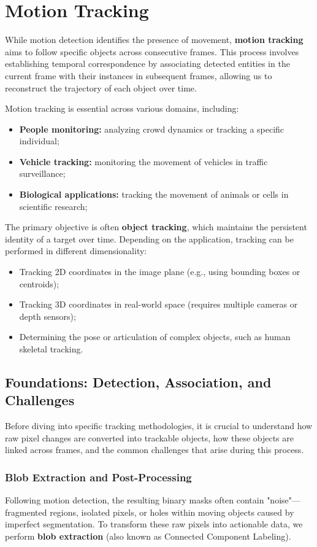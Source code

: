 \section{Motion Tracking}
While motion detection identifies the presence of movement, \textbf{motion tracking} aims to 
follow specific objects across consecutive frames. 
This process involves establishing temporal correspondence by associating detected entities in the current 
frame with their instances in subsequent frames, allowing us to reconstruct the trajectory of each object over time.

Motion tracking is essential across various domains, including:
\begin{itemize}
    \item \textbf{People monitoring:} analyzing crowd dynamics or tracking a specific individual;
    \item \textbf{Vehicle tracking:} monitoring the movement of vehicles in traffic surveillance;
    \item \textbf{Biological applications:} tracking the movement of animals or cells in scientific research;
\end{itemize}

The primary objective is often \textbf{object tracking}, which maintains the persistent identity of a target over time. 
Depending on the application, tracking can be performed in different dimensionality:
\begin{itemize}
\item Tracking 2D coordinates in the image plane (e.g., using bounding boxes or centroids);
\item Tracking 3D coordinates in real-world space (requires multiple cameras or depth sensors);
\item Determining the pose or articulation of complex objects, such as human skeletal tracking.
\end{itemize}

\subsection{Foundations: Detection, Association, and Challenges}
Before diving into specific tracking methodologies, it is crucial to understand how raw pixel changes are converted into trackable objects, how these objects are linked across frames, and the common challenges that arise during this process.

\subsubsection{Blob Extraction and Post-Processing}
Following motion detection, the resulting binary masks often contain "noise"—fragmented regions, 
isolated pixels, or holes within moving objects caused by imperfect segmentation. 
To transform these raw pixels into actionable data, we perform \textbf{blob extraction} (also known as Connected Component Labeling).

